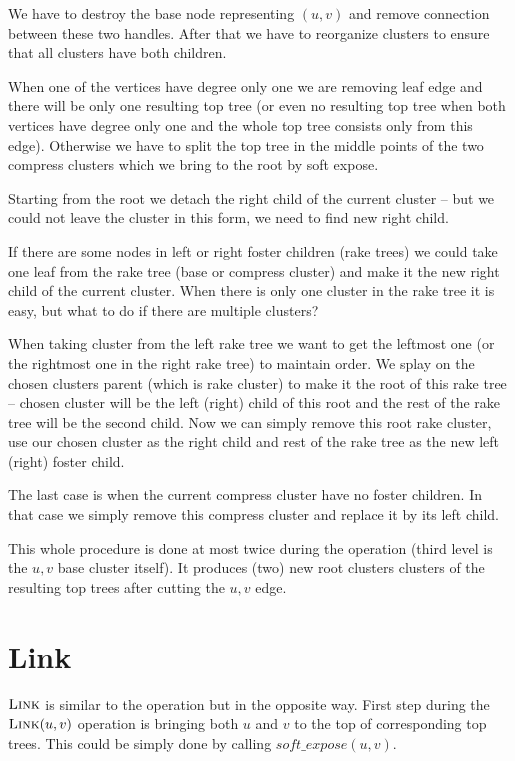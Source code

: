 We have to destroy the base node representing $(u,v)$ and remove connection
between these two handles. After that we have to reorganize clusters to ensure
that all clusters have both children.

When one of the vertices have degree only one we are removing leaf edge and there
will be only one resulting top tree (or even no resulting top tree when both
vertices have degree only one and the whole top tree consists only from this
edge). Otherwise we have to split the top tree in the middle points of the two
compress clusters which we bring to the root by soft expose.

Starting from the root we detach the right child of the current cluster -- but
we could not leave the cluster in this form, we need to find new right child.

If there are some nodes in left or right foster children (rake trees) we could
take one leaf from the rake tree (base or compress cluster) and make it the new
right child of the current cluster. When there is only one cluster in the rake
tree it is easy, but what to do if there are multiple clusters?

When taking cluster from the left rake tree we want to get the leftmost one
(or the rightmost one in the right rake tree) to maintain order. We splay on
the chosen clusters parent (which is rake cluster) to make it the root of this
rake tree -- chosen cluster will be the left (right) child of this root and
the rest of the rake tree will be the second child. Now we can simply remove this
root rake cluster, use our chosen cluster as the right child and rest of the
rake tree as the new left (right) foster child.

The last case is when the current compress cluster have no foster children.
In that case we simply remove this compress cluster and replace it by its left
child.

This whole procedure is done at most twice during the \Cut{} operation (third
level is the $u,v$ base cluster itself). It produces (two) new root clusters
clusters of the resulting top trees after cutting the $u,v$ edge.

\section{Link}
\vskip-5pt %
$\hbox{\sc Link}$ is similar to the \Cut{} operation but in the opposite way. First step
during the $\hbox{\sc Link}(u,v)$ operation is bringing both $u$ and $v$ to the top of
corresponding top trees. This could be simply done by calling
$soft\_expose(u,v)$.

